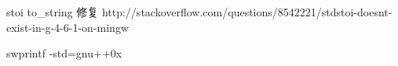 

stoi to\_string 修复
http://stackoverflow.com/questions/8542221/stdstoi-doesnt-exist-in-g-4-6-1-on-mingw


swprintf
-std=gnu++0x
